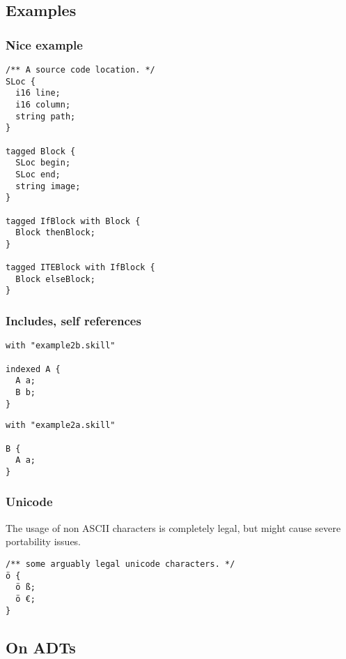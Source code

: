 \documentclass[a4paper,10pt]{article}
\begin{document}
\subsection{Examples}

\subsubsection*{Nice example}

\begin{lstlisting}[label=blockExample,caption=Running Example,language=skill]
/** A source code location. */
SLoc {
  i16 line;
  i16 column;
  string path;
}

tagged Block {
  SLoc begin;
  SLoc end;
  string image;
}

tagged IfBlock with Block {
  Block thenBlock;
}

tagged ITEBlock with IfBlock {
  Block elseBlock;
}
\end{lstlisting}

\subsubsection*{Includes, self references}

\begin{lstlisting}[label=example2a,caption=Example 2a,language=skill]
with "example2b.skill"

indexed A {
  A a;
  B b;
}
\end{lstlisting}

\begin{lstlisting}[label=example2b,caption=Example 2b,language=skill]
with "example2a.skill"

B {
  A a;
}
\end{lstlisting}

\subsubsection*{Unicode}
The usage of non ASCII characters is completely legal, but might cause severe portability issues.
\begin{lstlisting}[label=unicode,caption=Unicode Support,language=skill]
/** some arguably legal unicode characters. */
ö {
  ö ß;
  ö €;
}
\end{lstlisting}


\subsection{On ADTs}
\end{document}
